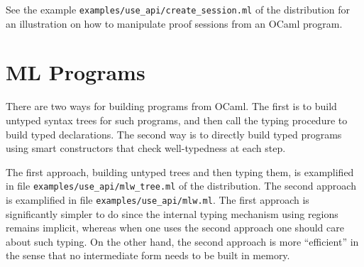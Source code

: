 See the example \verb|examples/use_api/create_session.ml| of the
distribution for an illustration on how to manipulate proof sessions
from an OCaml program.

\section{ML Programs}

There are two ways for building \whyml programs from OCaml. The first
is to build untyped syntax trees for such \whyml programs, and then
call the \why typing procedure to build typed declarations. The second
way is to directly build typed programs using smart constructors that
check well-typedness at each step.

The first approach, building untyped trees and then typing them, is
examplified in file \verb|examples/use_api/mlw_tree.ml| of the
distribution. The second approach is
examplified in file \verb|examples/use_api/mlw.ml|. The first approach
is significantly simpler to do since the internal typing mechanism
using regions remains implicit, whereas when one uses the second
approach one should care about such typing. On the other hand, the
second approach is more ``efficient'' in the sense that no
intermediate form needs to be built in memory.




